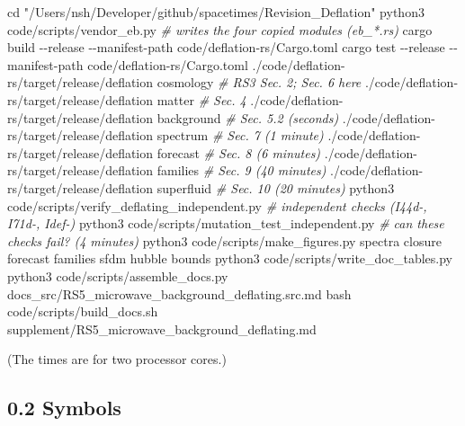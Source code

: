 \documentclass[
  10pt,
]{article}
\newenvironment{Shaded}{}{}
\newcommand{\AttributeTok}[1]{\textcolor[rgb]{0.49,0.56,0.16}{#1}}
\newcommand{\BuiltInTok}[1]{\textcolor[rgb]{0.00,0.50,0.00}{#1}}
\newcommand{\CommentTok}[1]{\textcolor[rgb]{0.38,0.63,0.69}{\textit{#1}}}
\newcommand{\ExtensionTok}[1]{#1}
\newcommand{\FunctionTok}[1]{\textcolor[rgb]{0.02,0.16,0.49}{#1}}
\newcommand{\NormalTok}[1]{#1}
\newcommand{\StringTok}[1]{\textcolor[rgb]{0.25,0.44,0.63}{#1}}
\begin{document}
\begin{Shaded}
\begin{Highlighting}[]
\BuiltInTok{cd} \StringTok{"/Users/nsh/Developer/github/spacetimes/Revision\_Deflation"}
\ExtensionTok{python3}\NormalTok{ code/scripts/vendor\_eb.py          }\CommentTok{\# writes the four copied modules (eb\_*.rs)}
\ExtensionTok{cargo}\NormalTok{ build }\AttributeTok{{-}{-}release} \AttributeTok{{-}{-}manifest{-}path}\NormalTok{ code/deflation{-}rs/Cargo.toml}
\ExtensionTok{cargo}\NormalTok{ test }\AttributeTok{{-}{-}release} \AttributeTok{{-}{-}manifest{-}path}\NormalTok{ code/deflation{-}rs/Cargo.toml}
\ExtensionTok{./code/deflation{-}rs/target/release/deflation}\NormalTok{ cosmology    }\CommentTok{\# RS3 Sec. 2; Sec. 6 here}
\ExtensionTok{./code/deflation{-}rs/target/release/deflation}\NormalTok{ matter       }\CommentTok{\# Sec. 4}
\ExtensionTok{./code/deflation{-}rs/target/release/deflation}\NormalTok{ background   }\CommentTok{\# Sec. 5.2      (seconds)}
\ExtensionTok{./code/deflation{-}rs/target/release/deflation}\NormalTok{ spectrum     }\CommentTok{\# Sec. 7        (1 minute)}
\ExtensionTok{./code/deflation{-}rs/target/release/deflation}\NormalTok{ forecast     }\CommentTok{\# Sec. 8        (6 minutes)}
\ExtensionTok{./code/deflation{-}rs/target/release/deflation}\NormalTok{ families     }\CommentTok{\# Sec. 9        (40 minutes)}
\ExtensionTok{./code/deflation{-}rs/target/release/deflation}\NormalTok{ superfluid   }\CommentTok{\# Sec. 10       (20 minutes)}
\ExtensionTok{python3}\NormalTok{ code/scripts/verify\_deflating\_independent.py  }\CommentTok{\# independent checks (I44d{-}, I71d{-}, Idef{-})}
\ExtensionTok{python3}\NormalTok{ code/scripts/mutation\_test\_independent.py         }\CommentTok{\# can these checks fail? (4 minutes)}
\ExtensionTok{python3}\NormalTok{ code/scripts/make\_figures.py spectra closure forecast families sfdm hubble bounds}
\ExtensionTok{python3}\NormalTok{ code/scripts/write\_doc\_tables.py}
\ExtensionTok{python3}\NormalTok{ code/scripts/assemble\_docs.py docs\_src/RS5\_microwave\_background\_deflating.src.md}
\FunctionTok{bash}\NormalTok{ code/scripts/build\_docs.sh supplement/RS5\_microwave\_background\_deflating.md}
\end{Highlighting}
\end{Shaded}

(The times are for two processor cores.)

\hypertarget{symbols}{%
\subsection{0.2 Symbols}\label{symbols}}
\end{document}
